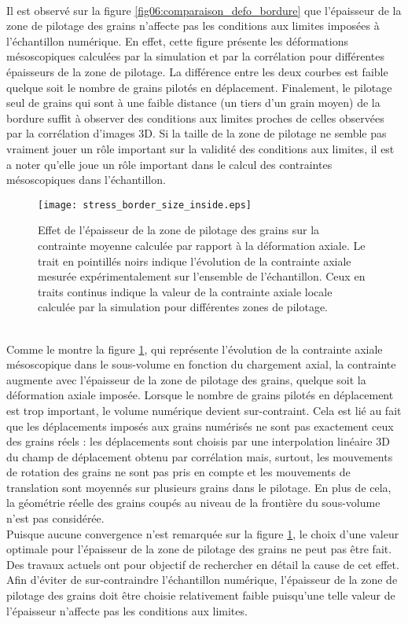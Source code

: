 			\\Il est observé sur la figure \ref{fig06:comparaison_defo_bordure} que l'épaisseur de la zone de pilotage des grains n'affecte pas les conditions aux limites imposées à l'échantillon numérique. En effet, cette figure présente les déformations mésoscopiques calculées par la simulation et par la corrélation pour différentes épaisseurs de la zone de pilotage. La différence entre les deux courbes est faible quelque soit le nombre de grains pilotés en déplacement. Finalement, le pilotage seul de grains qui sont à une faible distance (un tiers d'un grain moyen) de la bordure suffit à observer des conditions aux limites proches de celles observées par la corrélation d'images 3D. Si la taille de la zone de pilotage ne semble pas vraiment jouer un rôle important sur la validité des conditions aux limites, il est a noter qu'elle joue un rôle important dans le calcul des contraintes mésoscopiques dans l'échantillon.
			\begin{figure}\centering
				\texttt{[image: stress\_border\_size\_inside.eps]}
				\caption{\label{fig06:contraintes_bordure}Effet de l'épaisseur de la zone de pilotage des grains sur la contrainte moyenne calculée par rapport à la déformation axiale. Le trait en pointillés noirs indique l'évolution de la contrainte axiale mesurée expérimentalement sur l'ensemble de l'échantillon. Ceux en traits continus indique la valeur de la contrainte axiale locale calculée par la simulation pour différentes zones de pilotage.}
			\end{figure}
			\\Comme le montre la figure \ref{fig06:contraintes_bordure}, qui représente l'évolution de la contrainte axiale mésoscopique dans le sous-volume en fonction du chargement axial, la contrainte augmente avec l'épaisseur de la zone de pilotage des grains, quelque soit la déformation axiale imposée. Lorsque le nombre de grains pilotés en déplacement est trop important, le volume numérique devient sur-contraint. Cela est lié au fait que les déplacements imposés aux grains numérisés ne sont pas exactement ceux des grains réels : les déplacements sont choisis par une interpolation linéaire 3D du champ de déplacement obtenu par corrélation mais, surtout, les mouvements de rotation des grains ne sont pas pris en compte et les mouvements de translation sont moyennés sur plusieurs grains dans le pilotage. En plus de cela, la géométrie réelle des grains coupés au niveau de la frontière du sous-volume n'est pas considérée.
			\\Puisque aucune convergence n'est remarquée sur la figure \ref{fig06:contraintes_bordure}, le choix d'une valeur optimale pour l'épaisseur de la zone de pilotage des grains ne peut pas être fait. Des travaux actuels ont pour objectif de rechercher en détail la cause de cet effet. Afin d'éviter de sur-contraindre l'échantillon numérique, l'épaisseur de la zone de pilotage des grains doit être choisie relativement faible puisqu'une telle valeur de l'épaisseur n'affecte pas les conditions aux limites.
